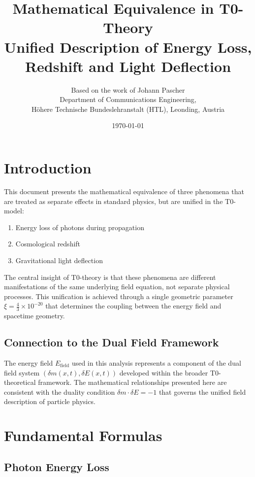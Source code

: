 \documentclass[12pt,a4paper]{article}
\title{\Huge\textbf{Mathematical Equivalence in T0-Theory}\\\Large Unified Description of Energy Loss, Redshift and Light Deflection}
\author{Based on the work of Johann Pascher\\
	Department of Communications Engineering, \\H\"ohere Technische Bundeslehranstalt (HTL), Leonding, Austria}
\date{\today}
\newcommand{\efield}{E_{\text{field}}}
\theoremstyle{definition}
\begin{document}
	
	\maketitle
	\tableofcontents
	\thispagestyle{fancy}
	\newpage
	
	\section{Introduction}
	
	This document presents the mathematical equivalence of three phenomena that are treated as separate effects in standard physics, but are unified in the T0-model:
	
	\begin{enumerate}
		\item Energy loss of photons during propagation
		\item Cosmological redshift
		\item Gravitational light deflection
	\end{enumerate}
	
	The central insight of T0-theory is that these phenomena are different manifestations of the same underlying field equation, not separate physical processes. This unification is achieved through a single geometric parameter $\xi = \frac{4}{3} \times 10^{-20}$ that determines the coupling between the energy field and spacetime geometry.
	
	\subsection{Connection to the Dual Field Framework}
	
	The energy field $\efield$ used in this analysis represents a component of the dual field system $(\delta m(x,t), \delta E(x,t))$ developed within the broader T0-theoretical framework. The mathematical relationships presented here are consistent with the duality condition $\delta m \cdot \delta E = -1$ that governs the unified field description of particle physics.
	
	\section{Fundamental Formulas}
	
	\subsection{Photon Energy Loss}
	
\end{document}
